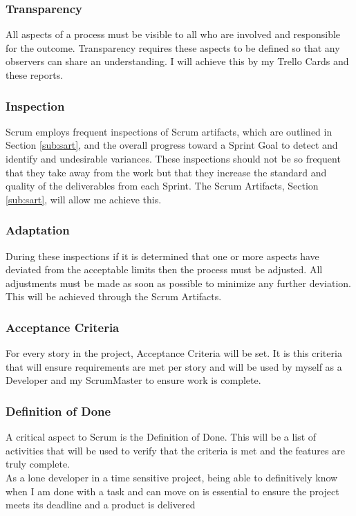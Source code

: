 \subsubsection{Transparency}
All aspects of a process must be visible to all who are involved and responsible for the outcome. Transparency requires these aspects to be defined so that any observers can share an understanding. I will achieve this by my Trello Cards and these reports.
\subsubsection{Inspection}
Scrum employs frequent inspections of Scrum artifacts, which are outlined in Section \ref{sub:sart}, and the overall progress toward a Sprint Goal to detect and identify and undesirable variances. These inspections should not be so frequent that they take away from the work but that they increase the standard and quality of the deliverables from each Sprint. The Scrum Artifacts, Section \ref{sub:sart}, will allow me achieve this.
\subsubsection{Adaptation}
During these inspections if it is determined that one or more aspects have deviated from the acceptable limits then the process must be adjusted. All adjustments must be made as soon as possible to minimize any further deviation. This will be achieved through the Scrum Artifacts.

\subsubsection{Acceptance Criteria}
\label{sub:ac}
For every story in the project, Acceptance Criteria will be set. It is this criteria that will ensure requirements are met per story and will be used by myself as a Developer and my ScrumMaster to ensure work is complete.

\subsubsection{Definition of Done}
A critical aspect to Scrum is the Definition of Done. This will be a list of activities that will be used to verify that the criteria is met and the features are truly complete.
\\ As a lone developer in a time sensitive project, being able to definitively know when I am done with a task and can move on is essential to ensure the project meets its deadline and a product is delivered

